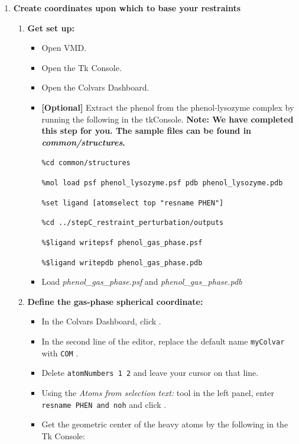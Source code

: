 \documentclass[9pt,tutorial]{Styling/livecoms}
\newcommand{\tkconsole}[1]{\texttt{\%#1}}
\newcommand{\filepath}[1]{\textit{#1}}
\newcommand{\button}[1]{
  \inlineBox[gray]{\texttt{#1}}
}
\newcommand{\menu}[1]{
  \textit{#1}
}
\newcommand{\textInput}[1]{
  \texttt{#1}
}
\begin{document}
    \begin{enumerate}[label=\arabic*.]
    
        \item \textbf{Create coordinates upon which to base your restraints}
        \begin{enumerate}[label=\alph*., ref=\theenumi.\alph*]
            \item \textbf{Get set up:}
            \begin{itemize}
                \item Open VMD.
                \item Open the Tk Console.
                \item Open the Colvars Dashboard.
                
                \item \textbf{[Optional]} Extract the phenol from the phenol-lysozyme complex by running the following in the tkConsole. \textbf{Note: We have completed this step for you. The sample files can be found in \filepath{common/structures}.}
            
                \tkconsole{cd common/structures}
                
                \tkconsole{mol load psf phenol\_lysozyme.psf pdb phenol\_lysozyme.pdb}
                
                \tkconsole{set ligand [atomselect top "resname PHEN"]}
                
                \tkconsole{cd ../stepC\_restraint\_perturbation/outputs}
                
                \tkconsole{\$ligand writepsf phenol\_gas\_phase.psf}
                
                \tkconsole{\$ligand writepdb phenol\_gas\_phase.pdb}

                \item Load \filepath{phenol\_gas\_phase.psf} and \filepath{phenol\_gas\_phase.pdb}

                \end{itemize}

            \item \textbf{Define the gas-phase spherical coordinate:} \label{step:defineGasRestraints}
            \begin{itemize}
                \item In the Colvars Dashboard, click \button{New [Ctrl-n]}.
                \item In the second line of the editor, replace the default name \textInput{myColvar} with \textInput{COM}.
                \item Delete \textInput{atomNumbers 1 2} and leave your cursor on that line.
                \item Using the \menu{Atoms from selection text:} tool in the left panel, enter \textInput{resname PHEN and noh} and click \button{Insert [Enter]}.
                \item Get the geometric center of the heavy atoms by  the following in the Tk Console:
                

\end{itemize}
\end{enumerate}
\end{enumerate}
\end{document}
